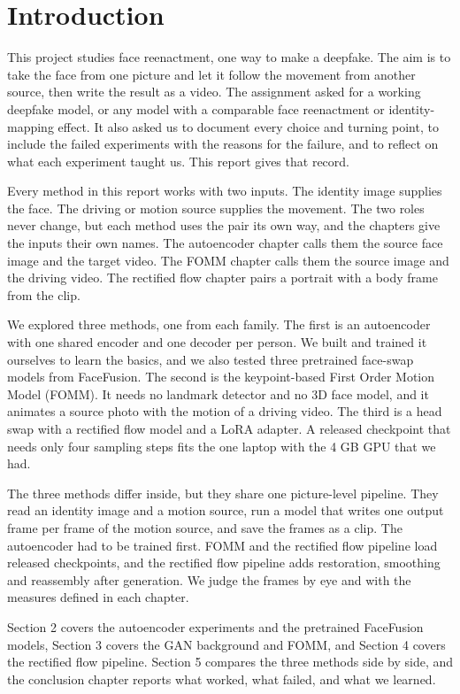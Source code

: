 
\section{Introduction}

This project studies face reenactment, one way to make a deepfake. The aim is to
take the face from one picture and let it follow the movement from another
source, then write the result as a video. The assignment asked for a working
deepfake model, or any model with a comparable face reenactment or
identity-mapping effect. It also asked us to document every choice and turning
point, to include the failed experiments with the reasons for the failure, and
to reflect on what each experiment taught us. This report gives that record.

Every method in this report works with two inputs. The identity image supplies
the face. The driving or motion source supplies the movement. The two roles
never change, but each method uses the pair its own way, and the chapters give
the inputs their own names. The autoencoder chapter calls them the source face
image and the target video. The FOMM chapter calls them the source image and the
driving video. The rectified flow chapter pairs a portrait with a body frame
from the clip.

We explored three methods, one from each family. The first is an autoencoder
with one shared encoder and one decoder per person. We built and trained it
ourselves to learn the basics, and we also tested three pretrained face-swap
models from FaceFusion. The second is the keypoint-based First Order Motion
Model (FOMM). It needs no landmark detector and no 3D face model, and it
animates a source photo with the motion of a driving video. The third is a head
swap with a rectified flow model and a LoRA adapter. A released checkpoint that
needs only four sampling steps fits the one laptop with the 4 GB GPU that we
had.

The three methods differ inside, but they share one picture-level pipeline. They
read an identity image and a motion source, run a model that writes one output
frame per frame of the motion source, and save the frames as a clip. The
autoencoder had to be trained first. FOMM and the rectified flow pipeline load
released checkpoints, and the rectified flow pipeline adds restoration,
smoothing and reassembly after generation. We judge the frames by eye and with
the measures defined in each chapter.

Section 2 covers the autoencoder experiments and the pretrained FaceFusion
models, Section 3 covers the GAN background and FOMM, and Section 4 covers the
rectified flow pipeline. Section 5 compares the three methods side by side, and
the conclusion chapter reports what worked, what failed, and what we learned.
